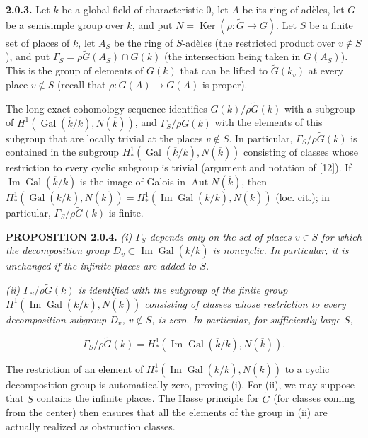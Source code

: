 \documentclass[10pt,a4paper]{article}
\begin{document}
\textbf{2.0.3.} Let \(k\) be a global field of characteristic 0, let \(A\) be its ring of adèles, let \(G\) be a semisimple group over \(k\), and put \(N=\operatorname{Ker}(\rho:\widetilde G\to G)\). Let \(S\) be a finite set of places of \(k\), let \(A_S\) be the ring of \(S\)-adèles (the restricted product over \(v\notin S\)), and put \(\Gamma_S=\rho\widetilde G(A_S)\cap G(k)\) (the intersection being taken in \(G(A_S)\)). This is the group of elements of \(G(k)\) that can be lifted to \(\widetilde G(k_v)\) at every place \(v\notin S\) (recall that \(\rho:\widetilde G(A)\to G(A)\) is proper).

The long exact cohomology sequence identifies \(G(k)/\rho\widetilde G(k)\) with a subgroup of \(H^1(\operatorname{Gal}(\overline k/k),N(\overline k))\), and \(\Gamma_S/\rho\widetilde G(k)\) with the elements of this subgroup that are locally trivial at the places \(v\notin S\). In particular, \(\Gamma_S/\rho\widetilde G(k)\) is contained in the subgroup \(H_*^1(\operatorname{Gal}(\overline k/k),N(\overline k))\) consisting of classes whose restriction to every cyclic subgroup is trivial (argument and notation of {[}12{]}). If \(\operatorname{Im}\operatorname{Gal}(\overline k/k)\) is the image of Galois in \(\operatorname{Aut}N(\overline k)\), then \(H_*^1(\operatorname{Gal}(\overline k/k),N(\overline k))=H_*^1(\operatorname{Im}\operatorname{Gal}(\overline k/k),N(\overline k))\) (loc. cit.); in particular, \(\Gamma_S/\rho\widetilde G(k)\) is finite.

\textbf{PROPOSITION 2.0.4.} \emph{(i) \(\Gamma_S\) depends only on the set of places \(v\in S\) for which the decomposition group \(D_v\subset\operatorname{Im}\operatorname{Gal}(\overline k/k)\) is noncyclic. In particular, it is unchanged if the infinite places are added to \(S\).}

\emph{(ii) \(\Gamma_S/\rho\widetilde G(k)\) is identified with the subgroup of the finite group \(H^1(\operatorname{Im}\operatorname{Gal}(\overline k/k),N(\overline k))\) consisting of classes whose restriction to every decomposition subgroup \(D_v\), \(v\notin S\), is zero. In particular, for sufficiently large \(S\),}

\[
\Gamma_S/\rho\widetilde G(k)=H_*^1(\operatorname{Im}\operatorname{Gal}(\overline k/k),N(\overline k)).
\]

The restriction of an element of \(H_*^1(\operatorname{Im}\operatorname{Gal}(\overline k/k),N(\overline k))\) to a cyclic decomposition group is automatically zero, proving (i). For (ii), we may suppose that \(S\) contains the infinite places. The Hasse principle for \(\widetilde G\) (for classes coming from the center) then ensures that all the elements of the group in (ii) are actually realized as obstruction classes.
\end{document}
